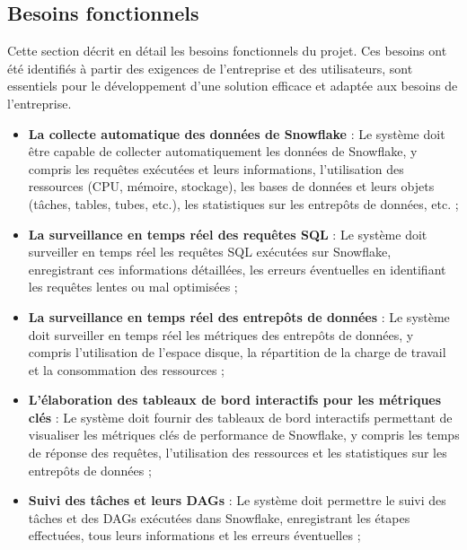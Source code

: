     \subsection{Besoins fonctionnels}
        \par Cette section décrit en détail les besoins fonctionnels du projet.
        Ces besoins ont été identifiés à partir des exigences de l'entreprise et des utilisateurs, sont essentiels pour le développement d'une solution efficace et adaptée aux besoins de l'entreprise.
    \begin{itemize}
            \item \textbf{La collecte automatique des données de Snowflake} :
            Le système doit être capable de collecter automatiquement les données de Snowflake, y compris les requêtes exécutées et leurs informations, l'utilisation des ressources (CPU, mémoire, stockage), 
            les bases de données et leurs objets (tâches, tables, tubes, etc.), les statistiques sur les entrepôts de données, etc. ;
            
            \item \textbf{La surveillance en temps réel des requêtes SQL} :
            Le système doit surveiller en temps réel les requêtes SQL exécutées sur Snowflake, enregistrant ces informations détaillées, 
            les erreurs éventuelles en identifiant les requêtes lentes ou mal optimisées ;
            
            \item \textbf{La surveillance en temps réel des entrepôts de données} :
            Le système doit surveiller en temps réel les métriques des entrepôts de données, y compris l'utilisation de l'espace disque,
             la répartition de la charge de travail et la consommation des ressources ;
            
            \item \textbf{L'élaboration des tableaux de bord interactifs pour les métriques clés} :
            Le système doit fournir des tableaux de bord interactifs permettant de visualiser les métriques clés de performance de Snowflake, 
            y compris les temps de réponse des requêtes, l'utilisation des ressources et les statistiques sur les entrepôts de données ;
            
            \item \textbf{Suivi des tâches et leurs DAGs} :
            Le système doit permettre le suivi des tâches et des DAGs exécutées dans Snowflake, enregistrant les étapes effectuées, tous leurs informations et les erreurs éventuelles ;
            

\end{itemize}

